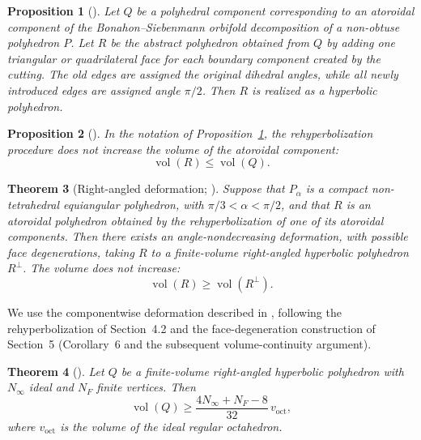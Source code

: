 \documentclass[12pt,a4paper]{article}
\newtheorem{theorem}{Theorem}[section]
\newtheorem{proposition}[theorem]{Proposition}
\theoremstyle{definition}
\DeclareMathOperator{\Vol}{vol}
\newcommand{\voct}{v_{\mathrm{oct}}}
\begin{document}
\begin{proposition}[{\cite[Proposition~2]{Atkinson2011}}]\label{prop:atkinson-realization}
Let \(Q\) be a polyhedral component corresponding to an atoroidal component of the Bonahon--Siebenmann orbifold decomposition of a non-obtuse polyhedron \(P\). Let \(R\) be the abstract polyhedron obtained from \(Q\) by adding one triangular or quadrilateral face for each boundary component created by the cutting. The old edges are assigned the original dihedral angles, while all newly introduced edges are assigned angle \(\pi/2\). Then \(R\) is realized as a hyperbolic polyhedron.
\end{proposition}

\begin{proposition}[{\cite[Proposition~3]{Atkinson2011}}]\label{prop:atkinson-volume}
In the notation of Proposition~\ref{prop:atkinson-realization}, the rehyperbolization procedure does not increase the volume of the atoroidal component:
\[
        \Vol(R)\le \Vol(Q).
\]
\end{proposition}

\begin{theorem}[Right-angled deformation; {\cite[Section~8, pp.~207--208]{Atkinson2011}}]\label{thm:atkinson-deformation}
Suppose that \(P_\alpha\) is a compact non-tetrahedral equiangular polyhedron, with
\(\pi/3<\alpha<\pi/2\), and that \(R\) is an atoroidal polyhedron obtained by
the rehyperbolization of one of its atoroidal components.  Then there exists
an angle-nondecreasing deformation, with possible face degenerations, taking
\(R\) to a finite-volume right-angled hyperbolic polyhedron \(R^\perp\).  The
volume does not increase:
\[
        \Vol(R)\ge \Vol(R^\perp).
\]
\end{theorem}

We use the componentwise deformation described in
\cite[Section~8]{Atkinson2011}, following the rehyperbolization of
Section~4.2 and the face-degeneration construction of Section~5
(Corollary~6 and the subsequent volume-continuity argument).

\begin{theorem}[{\cite[Theorem~10]{Atkinson2011}}]\label{thm:atkinson-ra-bound}
Let \(Q\) be a finite-volume right-angled hyperbolic polyhedron with \(N_\infty\) ideal and \(N_F\) finite vertices. Then
\[
        \Vol(Q)\ge
        \frac{4N_\infty+N_F-8}{32}\,\voct,
\]
where \(\voct\) is the volume of the ideal regular octahedron.
\end{theorem}
\end{document}
